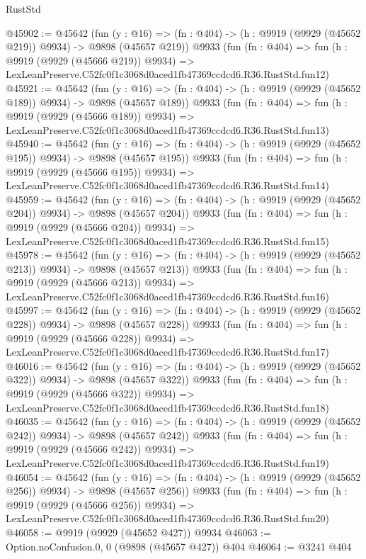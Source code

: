 \begin{lexlean}{RustStd}
\begin{coremodule}
@45902 := @45642
    (fun (y : @16) => (fn : @404) -> (h : @9919 (@9929 (@45652 @219)) @9934) -> @9898 (@45657 @219))
    @9933
    (fun (fn : @404) =>
    fun (h : @9919 (@9929 (@45666 @219)) @9934) =>
    LexLeanPreserve.C52fc0f1c3068d0aced1fb47369ccdcd6.R36.RustStd.fun12)
@45921 := @45642
    (fun (y : @16) => (fn : @404) -> (h : @9919 (@9929 (@45652 @189)) @9934) -> @9898 (@45657 @189))
    @9933
    (fun (fn : @404) =>
    fun (h : @9919 (@9929 (@45666 @189)) @9934) =>
    LexLeanPreserve.C52fc0f1c3068d0aced1fb47369ccdcd6.R36.RustStd.fun13)
@45940 := @45642
    (fun (y : @16) => (fn : @404) -> (h : @9919 (@9929 (@45652 @195)) @9934) -> @9898 (@45657 @195))
    @9933
    (fun (fn : @404) =>
    fun (h : @9919 (@9929 (@45666 @195)) @9934) =>
    LexLeanPreserve.C52fc0f1c3068d0aced1fb47369ccdcd6.R36.RustStd.fun14)
@45959 := @45642
    (fun (y : @16) => (fn : @404) -> (h : @9919 (@9929 (@45652 @204)) @9934) -> @9898 (@45657 @204))
    @9933
    (fun (fn : @404) =>
    fun (h : @9919 (@9929 (@45666 @204)) @9934) =>
    LexLeanPreserve.C52fc0f1c3068d0aced1fb47369ccdcd6.R36.RustStd.fun15)
@45978 := @45642
    (fun (y : @16) => (fn : @404) -> (h : @9919 (@9929 (@45652 @213)) @9934) -> @9898 (@45657 @213))
    @9933
    (fun (fn : @404) =>
    fun (h : @9919 (@9929 (@45666 @213)) @9934) =>
    LexLeanPreserve.C52fc0f1c3068d0aced1fb47369ccdcd6.R36.RustStd.fun16)
@45997 := @45642
    (fun (y : @16) => (fn : @404) -> (h : @9919 (@9929 (@45652 @228)) @9934) -> @9898 (@45657 @228))
    @9933
    (fun (fn : @404) =>
    fun (h : @9919 (@9929 (@45666 @228)) @9934) =>
    LexLeanPreserve.C52fc0f1c3068d0aced1fb47369ccdcd6.R36.RustStd.fun17)
@46016 := @45642
    (fun (y : @16) => (fn : @404) -> (h : @9919 (@9929 (@45652 @322)) @9934) -> @9898 (@45657 @322))
    @9933
    (fun (fn : @404) =>
    fun (h : @9919 (@9929 (@45666 @322)) @9934) =>
    LexLeanPreserve.C52fc0f1c3068d0aced1fb47369ccdcd6.R36.RustStd.fun18)
@46035 := @45642
    (fun (y : @16) => (fn : @404) -> (h : @9919 (@9929 (@45652 @242)) @9934) -> @9898 (@45657 @242))
    @9933
    (fun (fn : @404) =>
    fun (h : @9919 (@9929 (@45666 @242)) @9934) =>
    LexLeanPreserve.C52fc0f1c3068d0aced1fb47369ccdcd6.R36.RustStd.fun19)
@46054 := @45642
    (fun (y : @16) => (fn : @404) -> (h : @9919 (@9929 (@45652 @256)) @9934) -> @9898 (@45657 @256))
    @9933
    (fun (fn : @404) =>
    fun (h : @9919 (@9929 (@45666 @256)) @9934) =>
    LexLeanPreserve.C52fc0f1c3068d0aced1fb47369ccdcd6.R36.RustStd.fun20)
@46058 := @9919 (@9929 (@45652 @427)) @9934
@46063 := Option.noConfusion.{0, 0} (@9898 (@45657 @427)) @404
@46064 := @3241 @404

\end{coremodule}
\end{lexlean}
